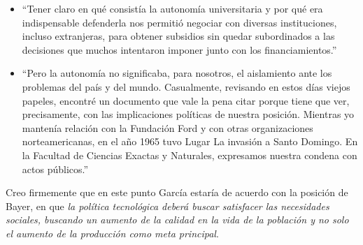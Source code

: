\begin{itemize}
    \item ``Tener claro en qué consistía la autonomía universitaria y por qué era indispensable defenderla nos permitió negociar con diversas instituciones, incluso extranjeras, para obtener subsidios sin quedar subordinados a las decisiones que muchos intentaron imponer junto con los financiamientos.''
    \item ``Pero la autonomía no significaba, para nosotros, el aislamiento ante los problemas del país y del mundo. Casualmente, revisando en estos días viejos papeles, encontré un documento que vale la pena citar porque tiene que ver, precisamente, con las implicaciones políticas de nuestra posición. Mientras yo mantenía relación con la Fundación Ford y con otras organizaciones norteamericanas, en el año 1965 tuvo Lugar La invasión a Santo Domingo. En la Facultad de Ciencias Exactas y Naturales, expresamos nuestra condena con actos públicos.''
\end{itemize}

Creo firmemente que en este punto García estaría de acuerdo con la posición de Bayer, en que \textit{la política tecnológica deberá buscar satisfacer las necesidades sociales, buscando un aumento de la calidad en la vida de la población y no solo el aumento de la producción como meta principal}.



